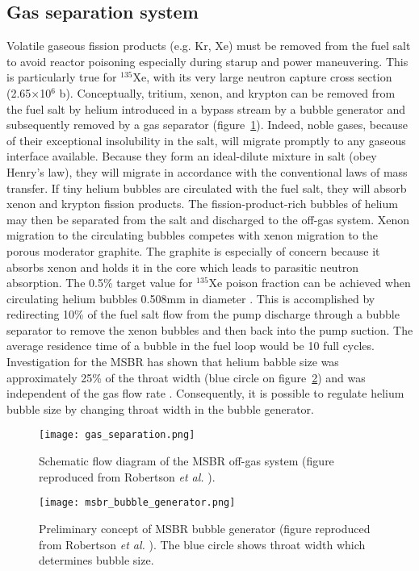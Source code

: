 \subsection{Gas separation system}
Volatile gaseous fission products (e.g. Kr, Xe) must be removed from the fuel salt 
to avoid reactor poisoning especially during starup and power maneuvering. This is 
particularly true for $^{135}$Xe, with its very large neutron capture cross section 
(2.65$\times$10$^6$ b). Conceptually, tritium, xenon, and krypton can be removed 
from the fuel salt by 
helium introduced in a bypass stream by a bubble generator and subsequently removed 
by a gas separator (figure~\ref{fig:gas_removal_system}). Indeed, noble gases, because of their exceptional insolubility 
in the salt, will migrate promptly to any gaseous interface available. Because 
they form an ideal-dilute mixture in salt (obey Henry's law), they will migrate in 
accordance with the conventional laws of mass transfer. If tiny helium bubbles 
are circulated with the fuel salt, they will absorb xenon and krypton fission 
products. The fission-product-rich bubbles of helium may then be separated from 
the salt and discharged to the off-gas system. Xenon migration to the circulating 
bubbles competes with xenon migration to the porous moderator graphite. 
The graphite is especially of concern because it absorbs xenon and holds it in the 
core which leads to parasitic neutron absorption. The 0.5\% target value for 
$^{135}$Xe poison fraction can be achieved when circulating helium bubbles 
0.508mm in diameter \cite{robertson_conceptual_1971}. This is accomplished by 
redirecting 10\% of the fuel salt flow from the pump discharge 
through a bubble separator 
to remove the xenon bubbles and then back into the pump suction. The average 
residence time of a bubble in the fuel loop would be 10 full cycles. Investigation 
for the \gls{MSBR} has shown that helium babble size was approximately 25\% of the 
throat width (blue circle on figure~\ref{fig:bubble_separator}) and was independent 
of the gas flow rate \cite{robertson_conceptual_1971}. Consequently, it is possible 
to regulate helium bubble size by changing throat width in the bubble generator.
\begin{figure}[htp!] %
  \centering
  \texttt{[image: gas\_separation.png]}
  \caption{Schematic flow diagram of the \gls{MSBR} off-gas system (figure reproduced from 
  Robertson \emph{et al.} \cite{robertson_conceptual_1971}).}
  \label{fig:gas_removal_system}
\end{figure}
\begin{figure}[htp!] %
  \centering
  \texttt{[image: msbr\_bubble\_generator.png]}
  \caption{Preliminary concept of \gls{MSBR} bubble generator (figure reproduced from 
  Robertson \emph{et al.} \cite{robertson_conceptual_1971}). The blue circle shows 
  throat width which determines bubble size.}
  \label{fig:bubble_separator}
\end{figure}

